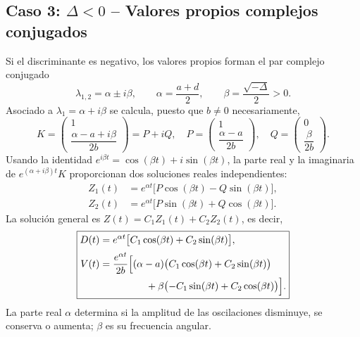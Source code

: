 \documentclass[10pt,letterpaper]{article}
\newcommand{\mat}[1]{\begin{pmatrix}#1\end{pmatrix}}
\begin{document}
\subsection{Caso 3: $\Delta<0$ -- Valores propios complejos conjugados}
Si el discriminante es negativo, los valores propios forman el par complejo conjugado
\begin{equation}\label{eq:complex_lambda}
\lambda_{1,2}=\alpha\pm i\beta,\qquad
\alpha=\frac{a+d}{2},\qquad \beta=\frac{\sqrt{-\Delta}}2>0.
\end{equation}
Asociado a $\lambda_1=\alpha+i\beta$ se calcula, puesto que $b\ne0$ necesariamente,
\begin{equation}\label{eq:complex_K}
K=\mat{1\\\dfrac{\alpha-a+i\beta}{2b}}=P+iQ,
\quad P=\mat{1\\\dfrac{\alpha-a}{2b}},\quad Q=\mat{0\\\dfrac{\beta}{2b}}.
\end{equation}
Usando la identidad $e^{i\beta t}=\cos(\beta t)+i\sin(\beta t)$, la parte real y la imaginaria de $e^{(\alpha+i\beta)t}K$ proporcionan dos soluciones reales independientes:
\begin{align}
Z_1(t)&=e^{\alpha t}\bigl[P\cos(\beta t)-Q\sin(\beta t)\bigr],\\
Z_2(t)&=e^{\alpha t}\bigl[P\sin(\beta t)+Q\cos(\beta t)\bigr].
\end{align}
La solución general es $Z(t)=C_1Z_1(t)+C_2Z_2(t)$, es decir,
\begin{equation}\label{eq:DVcomplex}
\boxed{\begin{aligned}
D(t)&=e^{\alpha t}\bigl[C_1\cos(\beta t)+C_2\sin(\beta t)\bigr],\\[2pt]
V(t)&=\frac{e^{\alpha t}}{2b}\Bigl[
(\alpha-a)\bigl(C_1\cos(\beta t)+C_2\sin(\beta t)\bigr)\\
&\hspace{4.7em}+\beta\bigl(-C_1\sin(\beta t)+C_2\cos(\beta t)\bigr)
\Bigr].
\end{aligned}}
\end{equation}
La parte real $\alpha$ determina si la amplitud de las oscilaciones disminuye, se conserva o aumenta; $\beta$ es su frecuencia angular.
\end{document}
